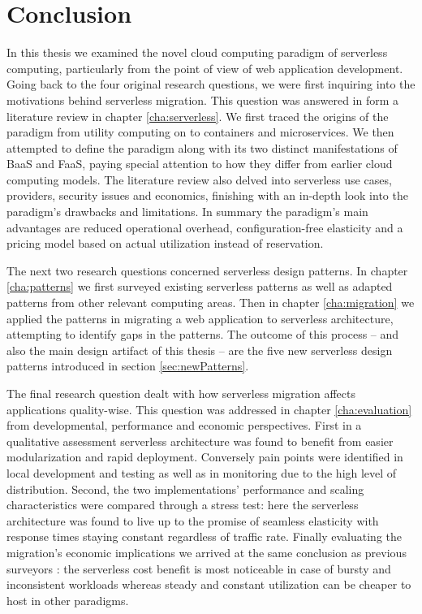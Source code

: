 \chapter{Conclusion}


In this thesis we examined the novel cloud computing paradigm of serverless computing, particularly from the point of view of web application development. Going back to the four original research questions, we were first inquiring into the motivations behind serverless migration. This question was answered in form a literature review in chapter \ref{cha:serverless}. We first traced the origins of the paradigm from utility computing on to containers and microservices. We then attempted to define the paradigm along with its two distinct manifestations of BaaS and FaaS, paying special attention to how they differ from earlier cloud computing models. The literature review also delved into serverless use cases, providers, security issues and economics, finishing with an in-depth look into the paradigm's drawbacks and limitations. In summary the paradigm's main advantages are reduced operational overhead, configuration-free elasticity and a pricing model based on actual utilization instead of reservation.

The next two research questions concerned serverless design patterns. In chapter \ref{cha:patterns} we first surveyed existing serverless patterns as well as adapted patterns from other relevant computing areas. Then in chapter \ref{cha:migration} we applied the patterns in migrating a web application to serverless architecture, attempting to identify gaps in the patterns. The outcome of this process -- and also the main design artifact of this thesis -- are the five new serverless design patterns introduced in section \ref{sec:newPatterns}.

The final research question dealt with how serverless migration affects applications quality-wise. This question was addressed in chapter \ref{cha:evaluation} from developmental, performance and economic perspectives. First in a qualitative assessment serverless  architecture was found to benefit from easier modularization and rapid deployment. Conversely pain points were identified in local development and testing as well as in monitoring due to the high level of distribution. Second, the two implementations' performance and scaling characteristics were compared through a stress test: here the serverless architecture was found to live up to the promise of seamless elasticity with response times staying constant regardless of traffic rate. Finally evaluating the migration's economic implications we arrived at the same conclusion as previous surveyors \parencite[e.g.][]{baldini17currentTrends}: the serverless cost benefit is most noticeable in case of bursty and inconsistent workloads whereas steady and constant utilization can be cheaper to host in other paradigms.

